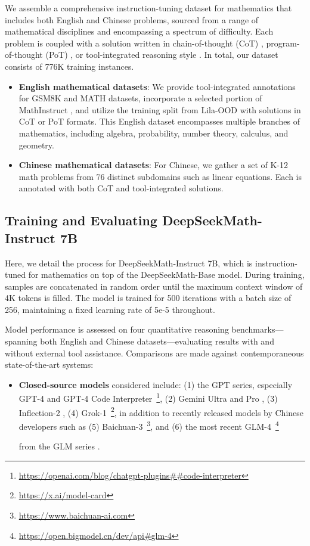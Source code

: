 We assemble a comprehensive instruction-tuning dataset for mathematics that includes both English and Chinese problems, sourced from a range of mathematical disciplines and encompassing a spectrum of difficulty. Each problem is coupled with a solution written in chain-of-thought (CoT) \citep{cot}, program-of-thought (PoT) \citep{pot,pal}, or tool-integrated reasoning style \citep{tora}. In total, our dataset consists of 776K training instances.

\begin{itemize}[topsep=0pt]
    \item \textbf{English mathematical datasets}: We provide tool-integrated annotations for GSM8K and MATH datasets, incorporate a selected portion of MathInstruct \citep{MathInstruct}, and utilize the training split from Lila-OOD \citep{lila} with solutions in CoT or PoT formats. This English dataset encompasses multiple branches of mathematics, including algebra, probability, number theory, calculus, and geometry.
    \item \textbf{Chinese mathematical datasets}: For Chinese, we gather a set of K-12 math problems from 76 distinct subdomains such as linear equations. Each is annotated with both CoT and tool-integrated solutions.
\end{itemize}

\subsection{Training and Evaluating DeepSeekMath-Instruct 7B}

Here, we detail the process for DeepSeekMath-Instruct 7B, which is instruction-tuned for mathematics on top of the DeepSeekMath-Base model. During training, samples are concatenated in random order until the maximum context window of 4K tokens is filled. The model is trained for 500 iterations with a batch size of 256, maintaining a fixed learning rate of 5e-5 throughout.

Model performance is assessed on four quantitative reasoning benchmarks—spanning both English and Chinese datasets—evaluating results with and without external tool assistance. Comparisons are made against contemporaneous state-of-the-art systems:

\begin{itemize}[topsep=0pt]
    \item \textbf{Closed-source models} considered include: (1) the GPT series, especially GPT-4 \citep{gpt4} and GPT-4 Code Interpreter~\footnote{\url{https://openai.com/blog/chatgpt-plugins\#\#code-interpreter}}, (2) Gemini Ultra and Pro \citep{gemini}, (3) Inflection-2 \citep{inflection-2}, (4) Grok-1~\footnote{\url{https://x.ai/model-card}}, in addition to recently released models by Chinese developers such as (5) Baichuan-3~\footnote{\url{https://www.baichuan-ai.com}}, and (6) the most recent GLM-4~\footnote{\url{https://open.bigmodel.cn/dev/api\#glm-4}}

    from the GLM series \citep{glm}.
\end{itemize}

